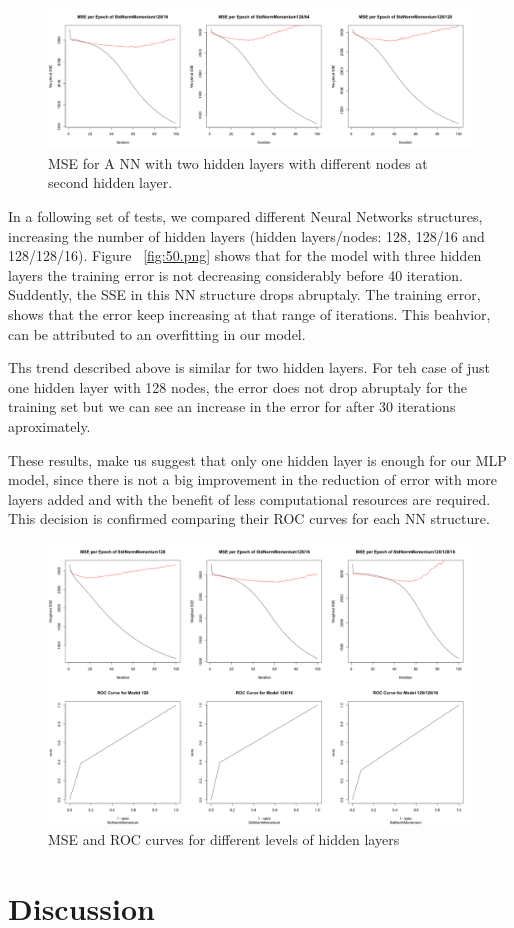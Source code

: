\documentclass[11.5pt]{article}
\newcounter{Figure}
\newcounter{graphics}
\begin{document}
\begin{figure}[h!]
  \caption{MSE for A NN with two hidden layers with different nodes at second hidden layer.}
  \includegraphics[width=1\textwidth]{report_mlp/128-16_64_128.png}
\end{figure}

In  a following set of tests, we compared different Neural Networks structures, increasing the number of hidden layers (hidden layers/nodes: 128, 128/16 and 128/128/16).  Figure ~\ref{fig:50.png} shows that for the model with three hidden layers the training error is not decreasing considerably before 40 iteration. Suddently, the SSE in this NN structure drops abruptaly. The training error, shows that the error keep increasing at that range of iterations. This beahvior, can be attributed to an overfitting in our model. \par

Ths trend described above is similar for two hidden layers. For teh case of just one hidden layer with 128 nodes, the error does not drop abruptaly for the training set but we can see an increase in the error for after 30 iterations aproximately. \par 

These results, make us suggest that only one hidden layer is enough for our MLP model, since there is not a big improvement in the reduction of error with more layers added and with the benefit of less computational resources are required.
This decision is confirmed comparing their ROC curves for each NN structure.
 








\begin{figure}[h!]
  \caption{MSE and ROC curves for different levels of hidden layers}
  \includegraphics[width=1\textwidth]{report_mlp/different_layers_MSE_ROC.png}
\end{figure}



\section{Discussion}


{}
\end{document}
